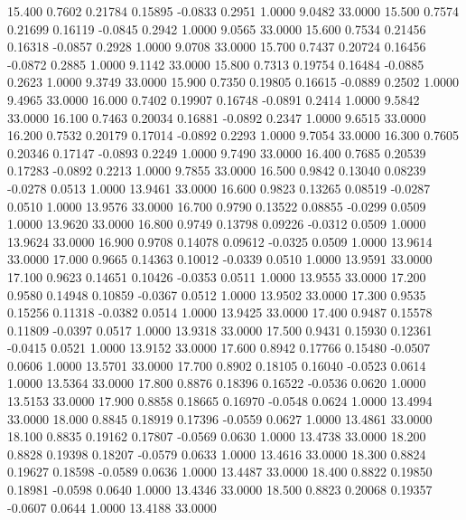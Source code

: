   15.400   0.7602   0.21784   0.15895  -0.0833   0.2951   1.0000   9.0482  33.0000
  15.500   0.7574   0.21699   0.16119  -0.0845   0.2942   1.0000   9.0565  33.0000
  15.600   0.7534   0.21456   0.16318  -0.0857   0.2928   1.0000   9.0708  33.0000
  15.700   0.7437   0.20724   0.16456  -0.0872   0.2885   1.0000   9.1142  33.0000
  15.800   0.7313   0.19754   0.16484  -0.0885   0.2623   1.0000   9.3749  33.0000
  15.900   0.7350   0.19805   0.16615  -0.0889   0.2502   1.0000   9.4965  33.0000
  16.000   0.7402   0.19907   0.16748  -0.0891   0.2414   1.0000   9.5842  33.0000
  16.100   0.7463   0.20034   0.16881  -0.0892   0.2347   1.0000   9.6515  33.0000
  16.200   0.7532   0.20179   0.17014  -0.0892   0.2293   1.0000   9.7054  33.0000
  16.300   0.7605   0.20346   0.17147  -0.0893   0.2249   1.0000   9.7490  33.0000
  16.400   0.7685   0.20539   0.17283  -0.0892   0.2213   1.0000   9.7855  33.0000
  16.500   0.9842   0.13040   0.08239  -0.0278   0.0513   1.0000  13.9461  33.0000
  16.600   0.9823   0.13265   0.08519  -0.0287   0.0510   1.0000  13.9576  33.0000
  16.700   0.9790   0.13522   0.08855  -0.0299   0.0509   1.0000  13.9620  33.0000
  16.800   0.9749   0.13798   0.09226  -0.0312   0.0509   1.0000  13.9624  33.0000
  16.900   0.9708   0.14078   0.09612  -0.0325   0.0509   1.0000  13.9614  33.0000
  17.000   0.9665   0.14363   0.10012  -0.0339   0.0510   1.0000  13.9591  33.0000
  17.100   0.9623   0.14651   0.10426  -0.0353   0.0511   1.0000  13.9555  33.0000
  17.200   0.9580   0.14948   0.10859  -0.0367   0.0512   1.0000  13.9502  33.0000
  17.300   0.9535   0.15256   0.11318  -0.0382   0.0514   1.0000  13.9425  33.0000
  17.400   0.9487   0.15578   0.11809  -0.0397   0.0517   1.0000  13.9318  33.0000
  17.500   0.9431   0.15930   0.12361  -0.0415   0.0521   1.0000  13.9152  33.0000
  17.600   0.8942   0.17766   0.15480  -0.0507   0.0606   1.0000  13.5701  33.0000
  17.700   0.8902   0.18105   0.16040  -0.0523   0.0614   1.0000  13.5364  33.0000
  17.800   0.8876   0.18396   0.16522  -0.0536   0.0620   1.0000  13.5153  33.0000
  17.900   0.8858   0.18665   0.16970  -0.0548   0.0624   1.0000  13.4994  33.0000
  18.000   0.8845   0.18919   0.17396  -0.0559   0.0627   1.0000  13.4861  33.0000
  18.100   0.8835   0.19162   0.17807  -0.0569   0.0630   1.0000  13.4738  33.0000
  18.200   0.8828   0.19398   0.18207  -0.0579   0.0633   1.0000  13.4616  33.0000
  18.300   0.8824   0.19627   0.18598  -0.0589   0.0636   1.0000  13.4487  33.0000
  18.400   0.8822   0.19850   0.18981  -0.0598   0.0640   1.0000  13.4346  33.0000
  18.500   0.8823   0.20068   0.19357  -0.0607   0.0644   1.0000  13.4188  33.0000
